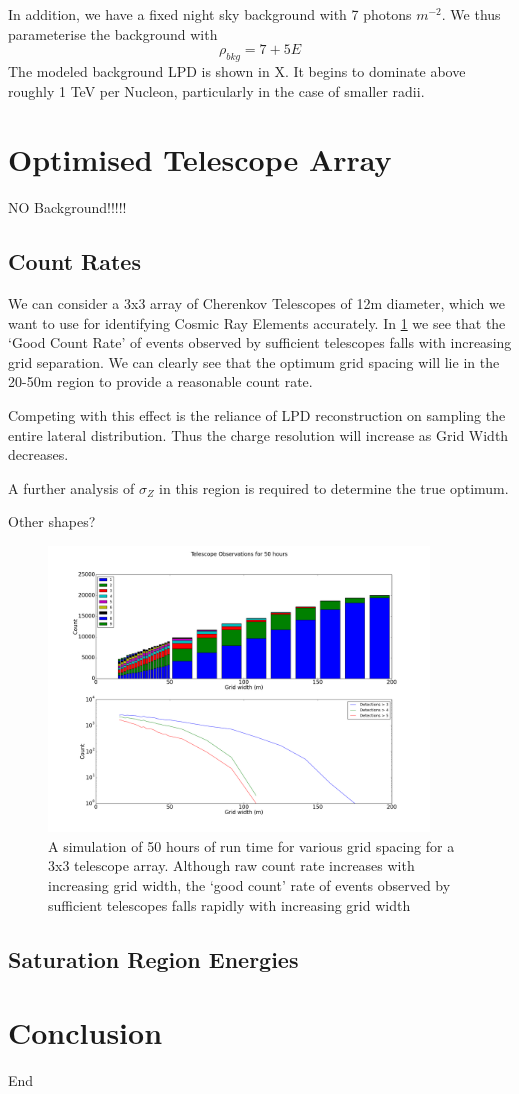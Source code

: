 \documentclass{article}
\begin{document}
In addition, we have a fixed night sky background with 7 photons $m^{-2}$. We thus parameterise the background with 
\[ \rho_{bkg}  = 7 + 5E\]
The modeled background LPD is shown in X. It begins to dominate above roughly 1 TeV per Nucleon, particularly in the case of smaller radii.

\section{Optimised Telescope Array}
NO Background!!!!!
\subsection{Count Rates}
We can consider a 3x3 array of Cherenkov Telescopes of 12m diameter, which we want to use for identifying Cosmic Ray Elements accurately. In \ref{fig:optmiselayout} we see that the \textquoteleft Good Count Rate' of events observed by sufficient telescopes falls with increasing grid separation. We can clearly see that the optimum grid spacing will lie in the 20-50m region to provide a reasonable count rate.

Competing with this effect is the reliance of LPD reconstruction on sampling the entire lateral distribution. Thus the charge resolution will increase as Grid Width decreases. 

A further analysis of $\sigma_{Z}$ in this region is required to determine the true optimum.

Other shapes? 

\begin{figure}
\begin{center}
\includegraphics[width=0.9\textwidth]{optimiselayout}
\caption{A simulation of 50 hours of run time for various grid spacing for a 3x3 telescope array. Although raw count rate increases with increasing grid width, the \textquoteleft good count' rate of events observed by sufficient telescopes falls rapidly with increasing grid width}
\label{fig:optmiselayout}
\end{center}
\end{figure}

\subsection{Saturation Region Energies}



\section{Conclusion}
End


\end{document}
